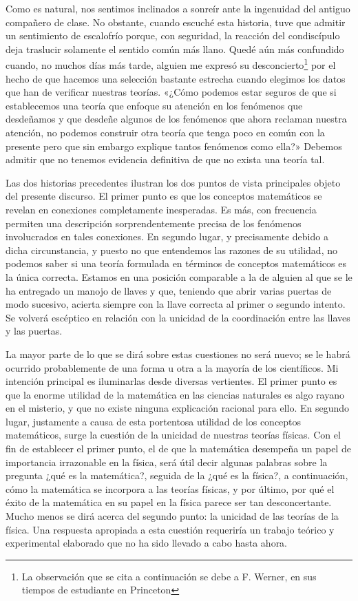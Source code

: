 \documentclass[a4paper, 12pt]{article}
\begin{document}
Como es natural, nos sentimos inclinados a sonreír ante la ingenuidad del antiguo compañero de clase. No obstante, cuando escuché esta historia, tuve que admitir un sentimiento de escalofrío porque, con seguridad, la reacción del condiscípulo deja traslucir solamente el sentido común más llano. Quedé aún más confundido cuando, no muchos días más tarde, alguien me expresó su desconcierto\footnote{La observación que se cita a continuación se debe a F. Werner, en sus tiempos de estudiante en Princeton} por el hecho de que hacemos una selección bastante estrecha cuando elegimos los datos que han de verificar nuestras teorías. «¿Cómo podemos estar seguros de que si establecemos una teoría que enfoque su atención en los fenómenos que desdeñamos y que desdeñe algunos de los fenómenos que ahora reclaman nuestra atención, no podemos construir otra teoría que tenga poco en común con la presente pero que sin embargo explique tantos fenómenos como ella?» Debemos admitir que no tenemos evidencia definitiva de que no exista una teoría tal.

Las dos historias precedentes ilustran los dos puntos de vista principales objeto del presente discurso. El primer punto es que los conceptos matemáticos se revelan en conexiones completamente inesperadas. Es más, con frecuencia permiten una descripción sorprendentemente precisa de los fenómenos involucrados en tales conexiones. En segundo lugar, y precisamente debido a dicha circunstancia, y puesto no que entendemos las razones de su utilidad, no podemos saber si una teoría formulada en términos de conceptos matemáticos es la única correcta. Estamos en una posición comparable a la de alguien al que se le ha entregado un manojo de llaves y que, teniendo que abrir varias puertas de modo sucesivo, acierta siempre con la llave correcta al primer o segundo intento. Se volverá escéptico en relación con la unicidad de la coordinación entre las llaves y las puertas.



La mayor parte de lo que se dirá sobre estas cuestiones no será nuevo; se le habrá ocurrido probablemente de una forma u otra a la mayoría de los científicos. Mi intención principal es iluminarlas desde diversas vertientes. El primer punto es que la enorme utilidad de la matemática en las ciencias naturales es algo rayano en el misterio, y que no existe ninguna explicación racional para ello. En segundo lugar, justamente a causa de esta portentosa utilidad de los conceptos matemáticos, surge la cuestión de la unicidad de nuestras teorías físicas. Con el fin de establecer el primer punto, el de que la matemática desempeña un papel de importancia irrazonable en la física, será útil decir algunas palabras sobre la pregunta ¿qué es la matemática?, seguida de la ¿qué es la física?, a continuación, cómo la matemática se incorpora a las teorías físicas, y por último, por qué el éxito de la matemática en su papel en la física parece ser tan desconcertante. Mucho menos se dirá acerca del segundo punto: la unicidad de las teorías de la física. Una respuesta apropiada a esta cuestión requeriría un trabajo teórico y experimental elaborado que no ha sido llevado a cabo hasta ahora.
\end{document}
